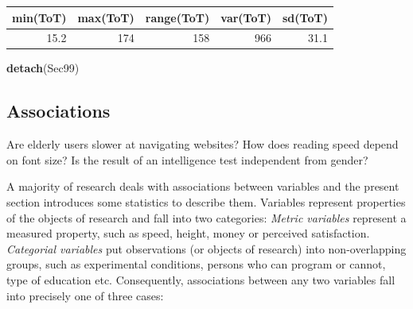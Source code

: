 \documentclass[]{svmono}
\newenvironment{Shaded}{\begin{snugshade}}{\end{snugshade}}
\newcommand{\KeywordTok}[1]{\textcolor[rgb]{0.13,0.29,0.53}{\textbf{#1}}}
\newcommand{\DecValTok}[1]{\textcolor[rgb]{0.00,0.00,0.81}{#1}}
\newcommand{\StringTok}[1]{\textcolor[rgb]{0.31,0.60,0.02}{#1}}
\newcommand{\ControlFlowTok}[1]{\textcolor[rgb]{0.13,0.29,0.53}{\textbf{#1}}}
\newcommand{\OperatorTok}[1]{\textcolor[rgb]{0.81,0.36,0.00}{\textbf{#1}}}
\newcommand{\NormalTok}[1]{#1}
\theoremstyle{definition}
\theoremstyle{definition}
\theoremstyle{definition}
\theoremstyle{remark}
\begin{document}
\begin{Shaded}
\end{Shaded}

\begin{longtable}[]{@{}rrrrr@{}}
\toprule
min(ToT) & max(ToT) & range(ToT) & var(ToT) & sd(ToT)\tabularnewline
\midrule
\endhead
15.2 & 174 & 158 & 966 & 31.1\tabularnewline
\bottomrule
\end{longtable}

\begin{Shaded}
\begin{Highlighting}[]
\KeywordTok{detach}\NormalTok{(Sec99)}
\end{Highlighting}
\end{Shaded}

\subsection{Associations}\label{associations}

Are elderly users slower at navigating websites? How does reading speed
depend on font size? Is the result of an intelligence test independent
from gender?

A majority of research deals with associations between variables and the
present section introduces some statistics to describe them. Variables
represent properties of the objects of research and fall into two
categories: \emph{Metric variables} represent a measured property, such
as speed, height, money or perceived satisfaction. \emph{Categorial
variables} put observations (or objects of research) into
non-overlapping groups, such as experimental conditions, persons who can
program or cannot, type of education etc. Consequently, associations
between any two variables fall into precisely one of three cases:
\end{document}
